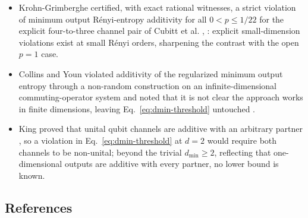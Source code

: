 \begin{itemize}
  \item Krohn-Grimberghe certified, with exact rational witnesses, a strict violation
of minimum output R\'enyi-entropy additivity for all $0<p\leq1/22$ for the
explicit four-to-three channel pair of Cubitt et al.
, :
explicit small-dimension violations exist at small R\'enyi orders, sharpening
the contrast with the open $p=1$ case.

  \item Collins and Youn violated additivity of the regularized minimum output
entropy through a non-random construction on an infinite-dimensional
commuting-operator system and noted that it is not clear the approach works in
finite dimensions, leaving Eq.~\eqref{eq:dmin-threshold} untouched
.

  \item King proved that unital qubit channels are additive with an arbitrary partner
, so a violation in
Eq.~\eqref{eq:dmin-threshold} at $d=2$ would require both channels to be
non-unital; beyond the trivial $d_{\min}\geq2$, reflecting that
one-dimensional outputs are additive with every partner, no lower bound is
known.
\end{itemize}

\subsection*{References}

